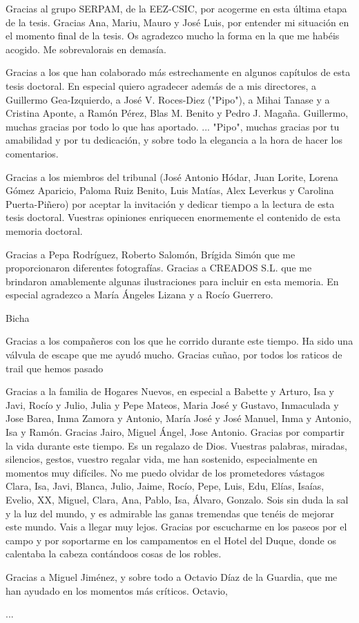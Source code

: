 Gracias al grupo SERPAM, de la EEZ-CSIC, por acogerme en esta última etapa de la tesis. Gracias Ana, Mariu, Mauro y José Luis, por entender mi situación en el momento final de la tesis. Os agradezco mucho la forma en la que me habéis acogido. Me sobrevalorais en demasía. 

Gracias a los que han colaborado más estrechamente en algunos capítulos de esta tesis doctoral. En especial quiero agradecer además de a mis directores, a Guillermo Gea-Izquierdo, a José V. Roces-Diez ("Pipo"), a Mihai Tanase y a Cristina Aponte, a Ramón Pérez, Blas M. Benito y Pedro J. Magaña. Guillermo, muchas gracias por todo lo que has aportado. ... 
"Pipo", muchas gracias por tu amabilidad y por tu dedicación, y sobre todo la elegancia a la hora de hacer los comentarios. 

Gracias a los miembros del tribunal (José Antonio Hódar, Juan Lorite, Lorena Gómez Aparicio, Paloma Ruiz Benito, Luis Matías, Alex Leverkus y Carolina Puerta-Piñero) por aceptar la invitación y dedicar tiempo a la lectura de esta tesis doctoral. Vuestras opiniones enriquecen enormemente el contenido de esta memoria doctoral.  

Gracias a  Pepa Rodríguez, Roberto Salomón, Brígida Simón que me proporcionaron diferentes fotografías. Gracias a CREADOS S.L. que me brindaron amablemente algunas ilustraciones para incluir en esta memoria. En especial agradezco a María Ángeles Lizana y a Rocío Guerrero. 

Bicha






Gracias a los compañeros con los que he corrido durante este tiempo. Ha sido una válvula de escape que me ayudó mucho. Gracias cuñao, por todos los raticos de trail que hemos pasado

Gracias a la familia de Hogares Nuevos, en especial a Babette y Arturo, Isa y Javi, Rocío y Julio, Julia y Pepe Mateos, Maria José y Gustavo, Inmaculada y Jose Barea, Inma Zamora y Antonio, María José y José Manuel, Inma y Antonio, Isa y Ramón. Gracias Jairo, Miguel Ángel, Jose Antonio. Gracias por compartir la vida durante este tiempo. Es un regalazo de Dios. Vuestras palabras, miradas, silencios, gestos, vuestro regalar vida, me han sostenido, especialmente en momentos muy difíciles. No me puedo olvidar de los prometedores vástagos Clara, Isa, Javi, Blanca, Julio, Jaime, Rocío, Pepe, Luis, Edu, Elías, Isaías, Evelio, XX, Miguel, Clara, Ana, Pablo, Isa, Álvaro, Gonzalo. Sois sin duda la sal y la luz del mundo, y es admirable las ganas tremendas que tenéis de mejorar este mundo. Vais a llegar muy lejos. Gracias por escucharme en los paseos por el campo y por soportarme en los campamentos en el Hotel del Duque, donde os calentaba la cabeza contándoos cosas de los robles.  



Gracias a Miguel Jiménez, y sobre todo a Octavio Díaz de la Guardia, que me han ayudado en los momentos más críticos. Octavio, 

... 
